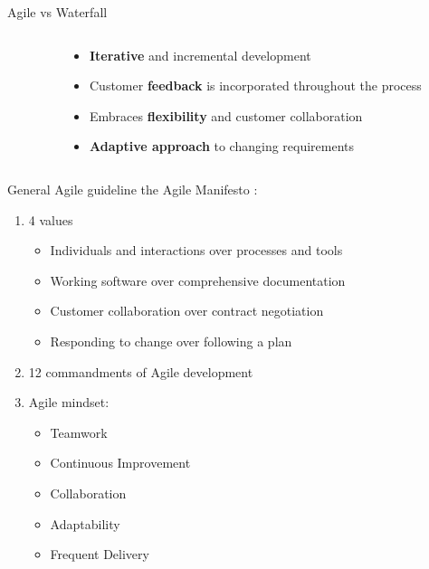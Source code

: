 \documentclass[10pt]{beamer}
\begin{document}
\begin{frame}{Agile vs Waterfall}
  \vspace{2cm}
  \begin{columns}[T]

    \begin{column}{0.5\textwidth}
    \end{column}

    \begin{column}{0.5\textwidth}
      \begin{itemize}
        \item<2-> \textbf{Iterative} and incremental development 
        \item<3-> Customer \textbf{feedback} is incorporated throughout the process
        \item<4-> Embraces \textbf{flexibility} and customer collaboration
        \item<5-> \textbf{Adaptive approach }to changing requirements
      \end{itemize}
    \end{column}

  \end{columns}
\end{frame}

\begin{frame}{General Agile guideline}
    the Agile Manifesto : \\
    \begin{enumerate}
    \item 4 values
    \begin{itemize}
      \item<2-> Individuals and interactions over processes and tools 
      \item<3-> Working software over comprehensive documentation
      \item<4-> Customer collaboration over contract negotiation 
      \item<5-> Responding to change over following a plan
    \end{itemize}
    \item 12 commandments of Agile development \\
    \item Agile mindset: 
    \begin{itemize}
      \item<6-> Teamwork
      \item<7-> Continuous Improvement
      \item<8-> Collaboration
      \item<9-> Adaptability
      \item<10-> Frequent Delivery
    \end{itemize}
    \end{enumerate}

\end{frame}
\end{document}
